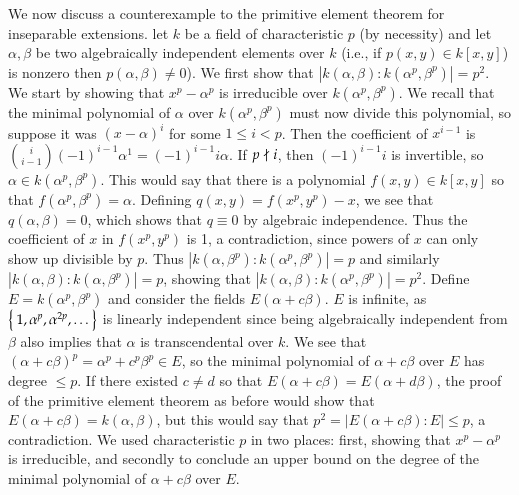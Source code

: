 \documentclass[12pt]{article}
\theoremstyle{definitionstyle}
\begin{document}
	We now discuss a counterexample to the primitive element theorem for inseparable extensions. let $k$ be a field of characteristic $p$ (by necessity) and let $\alpha, \beta$ be two algebraically independent elements over $k$ (i.e., if $p(x,y) \in k[x,y]$) is nonzero then $p(\alpha, \beta) \neq 0$). We first show that $|k(\alpha,\beta) : k(\alpha^p, \beta^p)| = p^2$. We start by showing that $x^p - \alpha^p$ is irreducible over $k(\alpha^p, \beta^p)$. We recall that the minimal polynomial of $\alpha$ over $k(\alpha^p, \beta^p)$ must now divide this polynomial, so suppose it was $(x-\alpha)^i$ for some $1 \leq i < p$. Then the coefficient of $x^{i-1}$ is ${i \choose i-1}(-1)^{i-1}\alpha^1 = (-1)^{i-1}i \alpha$. If $p \not \mid i$, then $(-1)^{i-1}i$ is invertible, so $\alpha \in k(\alpha^p, \beta^p)$. This would say that there is a polynomial $f(x,y) \in k[x,y]$ so that $f(\alpha^p, \beta^p) = \alpha$. Defining $q(x,y) = f(x^p, y^p) - x$, we see that $q(\alpha, \beta) = 0$, which shows that $q \equiv 0$ by algebraic independence. Thus the coefficient of $x$ in $f(x^p, y^p)$ is 1, a contradiction, since powers of $x$ can only show up divisible by $p$. Thus $|k(\alpha, \beta^p) : k(\alpha^p, \beta^p)| = p$ and similarly $|k(\alpha, \beta) : k(\alpha, \beta^p)| = p$, showing that $|k(\alpha, \beta) : k(\alpha^p, \beta^p)| = p^2$. Define $E = k(\alpha^p, \beta^p)$ and consider the fields $E(\alpha + c \beta)$. $E$ is infinite, as $\Set{1, \alpha^p, \alpha^{2p}, \ldots}$ is linearly independent since being algebraically independent from $\beta$ also implies that $\alpha$ is transcendental over $k$. We see that $(\alpha + c\beta)^p = \alpha^p + c^p\beta^p \in E$, so the minimal polynomial of $\alpha + c\beta$ over $E$ has degree $\leq p$. If there existed $c \neq d$ so that $E(\alpha+c\beta) = E(\alpha+d\beta)$, the proof of the primitive element theorem as before would show that $E(\alpha+c\beta) = k(\alpha, \beta)$, but this would say that $p^2 = |E(\alpha+c\beta) : E| \leq p$, a contradiction. We used characteristic $p$ in two places: first, showing that $x^p - \alpha^p$ is irreducible, and secondly to conclude an upper bound on the degree of the minimal polynomial of $\alpha + c\beta$ over $E$.
\end{document}
